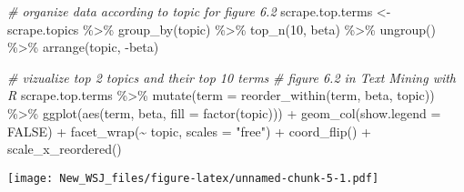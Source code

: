 \documentclass[
]{article}
\newenvironment{Shaded}{\begin{snugshade}}{\end{snugshade}}
\newcommand{\AttributeTok}[1]{\textcolor[rgb]{0.77,0.63,0.00}{#1}}
\newcommand{\CommentTok}[1]{\textcolor[rgb]{0.56,0.35,0.01}{\textit{#1}}}
\newcommand{\ConstantTok}[1]{\textcolor[rgb]{0.00,0.00,0.00}{#1}}
\newcommand{\DecValTok}[1]{\textcolor[rgb]{0.00,0.00,0.81}{#1}}
\newcommand{\FunctionTok}[1]{\textcolor[rgb]{0.00,0.00,0.00}{#1}}
\newcommand{\NormalTok}[1]{#1}
\newcommand{\OtherTok}[1]{\textcolor[rgb]{0.56,0.35,0.01}{#1}}
\newcommand{\SpecialCharTok}[1]{\textcolor[rgb]{0.00,0.00,0.00}{#1}}
\newcommand{\StringTok}[1]{\textcolor[rgb]{0.31,0.60,0.02}{#1}}
\begin{document}
\begin{Shaded}
\begin{Highlighting}[]
\CommentTok{\# organize data according to \textquotesingle{}topic\textquotesingle{} for figure 6.2}
\NormalTok{scrape.top.terms }\OtherTok{\textless{}{-}}\NormalTok{ scrape.topics }\SpecialCharTok{\%\textgreater{}\%}
  \FunctionTok{group\_by}\NormalTok{(topic) }\SpecialCharTok{\%\textgreater{}\%}
  \FunctionTok{top\_n}\NormalTok{(}\DecValTok{10}\NormalTok{, beta) }\SpecialCharTok{\%\textgreater{}\%}
  \FunctionTok{ungroup}\NormalTok{() }\SpecialCharTok{\%\textgreater{}\%}
  \FunctionTok{arrange}\NormalTok{(topic, }\SpecialCharTok{{-}}\NormalTok{beta)}

\CommentTok{\# vizualize top 2 topics and their top 10 terms}
\CommentTok{\# figure 6.2 in Text Mining with R}
\NormalTok{scrape.top.terms }\SpecialCharTok{\%\textgreater{}\%}
  \FunctionTok{mutate}\NormalTok{(}\AttributeTok{term =} \FunctionTok{reorder\_within}\NormalTok{(term, beta, topic)) }\SpecialCharTok{\%\textgreater{}\%}
  \FunctionTok{ggplot}\NormalTok{(}\FunctionTok{aes}\NormalTok{(term, beta, }\AttributeTok{fill =} \FunctionTok{factor}\NormalTok{(topic))) }\SpecialCharTok{+}
  \FunctionTok{geom\_col}\NormalTok{(}\AttributeTok{show.legend =} \ConstantTok{FALSE}\NormalTok{) }\SpecialCharTok{+}
  \FunctionTok{facet\_wrap}\NormalTok{(}\SpecialCharTok{\textasciitilde{}}\NormalTok{ topic, }\AttributeTok{scales =} \StringTok{"free"}\NormalTok{) }\SpecialCharTok{+}
  \FunctionTok{coord\_flip}\NormalTok{() }\SpecialCharTok{+}
  \FunctionTok{scale\_x\_reordered}\NormalTok{()}
\end{Highlighting}
\end{Shaded}

\texttt{[image: New\_WSJ\_files/figure-latex/unnamed-chunk-5-1.pdf]}
\end{document}
